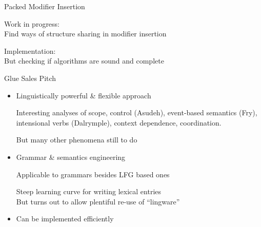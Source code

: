 \begin{hslide}{Packed Modifier Insertion}

Work in progress:\\
Find ways of structure sharing in modifier insertion


Implementation:\\
But checking if algorithms are sound and complete
\end{hslide}

\begin{hslide}{Glue Sales Pitch}

\begin{itemize}
\item Linguistically powerful \& flexible approach

Interesting analyses of scope, control (Asudeh), event-based semantics (Fry),
intensional verbs (Dalrymple), context dependence, coordination.

But many other phenomena still to do

\item Grammar \& semantics engineering

Applicable to grammars besides LFG based ones

Steep learning curve for writing lexical entries\\
But turns out to allow plentiful re-use of ``lingware''

\item Can be implemented efficiently
\end{itemize}

\end{hslide}


